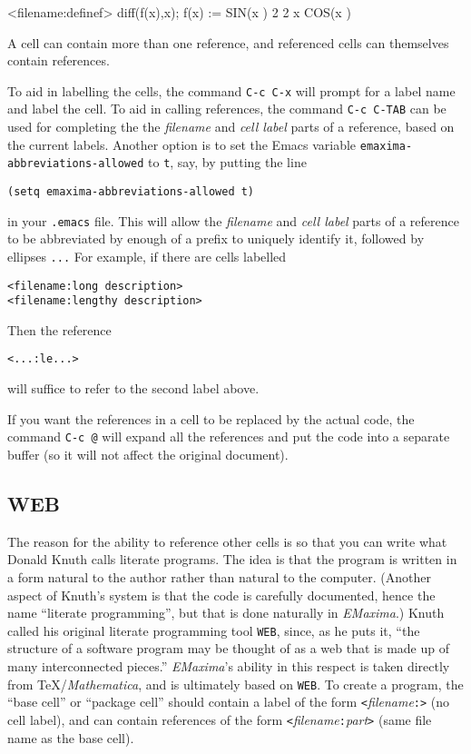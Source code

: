 \documentclass{article}
\newcommand{\emx}{\textsl{\sffamily EMaxima}}
\begin{document}
<filename:definef>
diff(f(x),x);
                                f(x) := SIN(x )
                                           2
                                  2 x COS(x )
\endmaxima

A cell can contain more than one reference, and referenced cells can
themselves contain references.  

To aid in labelling the cells, the command \texttt{C-c C-x}
will prompt for a label name and label the
cell.  To aid in calling references, the command \texttt{C-c C-TAB}
can be used for completing the
the \textsl{filename} and \textsl{cell label} parts of a reference, 
based on the current labels.  
Another option is to set the Emacs variable
\texttt{emaxima-abbreviations-allowed} to \texttt{t}, say, by putting
the line
\begin{verbatim}
(setq emaxima-abbreviations-allowed t)
\end{verbatim}
\noindent
in your \texttt{.emacs} file.  This will allow the \textsl{filename}
and \textsl{cell label} parts of a reference to be abbreviated by enough
of a prefix to uniquely identify it, followed by ellipses
\texttt{...}
For example, if there are cells labelled
\begin{verbatim}
<filename:long description>
<filename:lengthy description>
\end{verbatim}
\noindent
Then the reference
\begin{verbatim}
<...:le...>
\end{verbatim}
\noindent
will suffice to refer to the second label above.

If you want the references in a cell to be replaced by the actual
code, the command \texttt{C-c @} will expand all the
references and put the code into a separate buffer (so it will not
affect the original document).

\subsection{WEB}

\noindent
The reason for the ability to reference other cells is so that you can
write what Donald Knuth calls literate programs.  The idea is that the
program is written in a form natural to the author rather than natural
to the computer.  (Another aspect of Knuth's system is that the code
is carefully documented, hence the name ``literate programming'', but
that is done naturally in \emx{}.)  Knuth called his original
literate programming tool \texttt{WEB}, since, as he puts it,
``the structure of a software program may be thought of as a web that
is made up of many interconnected pieces.''  
\emx{}'s ability in this respect is taken directly from
\TeX{}/\textit{Mathematica}, and is ultimately based on
\texttt{WEB}. To create a 
program, the ``base cell'' or ``package cell'' should contain 
a label of the form \texttt{<}\textsl{filename}\texttt{:>} 
(no cell label), and can
contain references of the form 
\texttt{<}\textsl{filename}\texttt{:}\textsl{part}\texttt{>}
(same file name as the base cell).  
\end{document}
